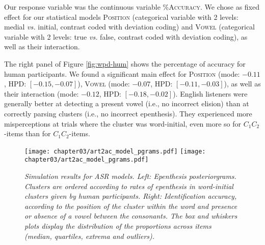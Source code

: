 {Our response variable was the continuous variable \textsc{\%Accuracy}.
We chose as fixed effect for our statistical models \textsc{Position} (categorical variable with 2 levels: medial \textit{vs.} initial, contrast coded with deviation coding) and \textsc{Vowel} (categorical variable with 2 levels: true \textit{vs.} false, contrast coded with deviation coding), as well as their interaction.

The right panel of Figure \ref{fig:wpd-hum} shows the percentage of accuracy for human participants. We found a significant main effect for \textsc{Position} (mode: $-0.11$, HPD: $[-0.15, -0.07]$), \textsc{Vowel} (mode: $-0.07$, HPD: $[-0.11, -0.03]$), as well as their interaction (mode: $-0.12$, HPD: $[-0.18, -0.02]$). English listeners were generally better at detecting a present vowel (i.e., no incorrect elision) than at correctly parsing clusters (i.e., no incorrect epenthesis). They experienced more misperceptions at trials where the cluster was word-initial, even more so for $C_{1}C_{2}$-items than for $C_{1}$\textipa{[@]}$C_{2}$-items. %

\begin{figure}[htb!]
    \centering
    \texttt{[image: chapter03/art2ac\_model\_pgrams.pdf]}%
    \hspace{0.5cm}
    \texttt{[image: chapter03/art2ac\_model\_pgrams.pdf]}

    \caption{\textit{Simulation results for ASR models.
      Left: Epenthesis posteriorgrams. Clusters are ordered according to rates of epenthesis in word-initial clusters given by human participants. 
      Right: Identification accuracy, according to the position of the cluster within the word and presence or absence of a vowel between the consonants. The box and whiskers plots display the distribution of the proportions across items (median, quartiles, extrema and outliers).}}
    \label{fig:wpd-mod}
  \end{figure}

}
